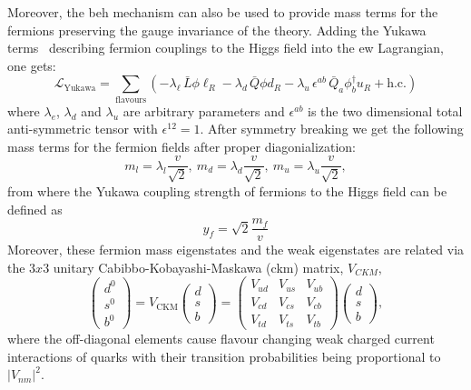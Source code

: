 Moreover, the \acrshort{beh} mechanism can also be used to provide mass terms for the fermions preserving the gauge invariance of the theory.
Adding the Yukawa terms~\cite{Peskin} describing fermion couplings to the Higgs field into the \acrshort{ew} Lagrangian, one gets:
\begin{equation}
\mathcal{L}_{\text{Yukawa}} = 
\sum_{\text{flavours}} \left( 
- \lambda_\ell \, \bar{L} \phi \ell_R 
- \lambda_d \, \bar{Q} \phi d_R 
- \lambda_u \, \epsilon^{ab} \, \bar{Q}_a \phi_b^{\dagger} u_R 
+ \text{h.c.} 
\right)
\end{equation}
where $\lambda_{e}$, $\lambda_{d}$ and $\lambda_{u}$ are arbitrary parameters and $\epsilon^{ab}$ is the two dimensional total anti-symmetric tensor with $\epsilon^{12}=1$. After symmetry breaking we get the following mass terms for the fermion fields after proper diagonialization: 
\begin{equation}
m_{l}=\lambda_{l}\frac{v}{\sqrt{2}}, \ m_{d}=\lambda_{d}\frac{v}{\sqrt{2}}, \ m_{u}=\lambda_{u}\frac{v}{\sqrt{2}},
\end{equation}
from where the Yukawa coupling strength of fermions to the Higgs field can be defined as
\begin{equation}
\label{yukawa}
y_{f}=\sqrt{2}\frac{m_{f}}{v}
\end{equation}
Moreover, these fermion mass eigenstates and the weak eigenstates are related via the $3x3$ unitary Cabibbo-Kobayashi-Maskawa (\acrshort{ckm}) matrix, $V_{CKM}$,
\begin{equation}
\begin{pmatrix}
d^0 \\
s^0 \\
b^0
\end{pmatrix}
= V_{\text{CKM}}
\begin{pmatrix}
d \\
s \\
b
\end{pmatrix}
=\begin{pmatrix}
V_{ud} & V_{us} & V_{ub} \\
V_{cd} & V_{cs} & V_{cb} \\
V_{td} & V_{ts} & V_{tb}
\end{pmatrix}
\begin{pmatrix}
d \\
s \\
b
\end{pmatrix},
\end{equation}
where the off-diagonal elements cause flavour changing weak charged current interactions of quarks with their transition probabilities being proportional to $|V_{nm}|^2$.

